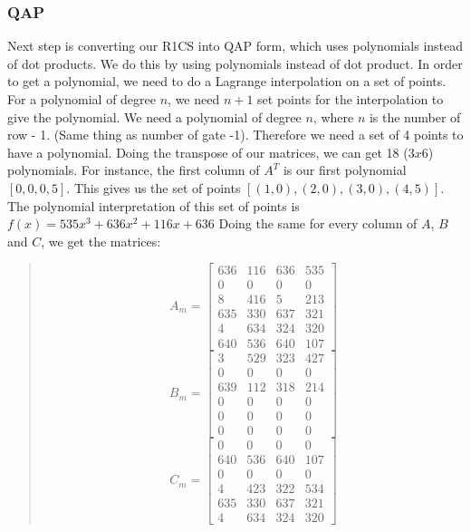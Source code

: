 \subsubsection{QAP}
Next step is converting our R1CS into QAP form, which uses polynomials instead of dot products.
We do this by using polynomials instead of dot product.
In order to get a polynomial, we need to do a Lagrange interpolation on a set of points.
For a polynomial of degree $n$, we need $n+1$ set points for the interpolation to give the polynomial.
We need a polynomial of degree $n$, where $n$ is the number of row - 1. (Same thing as number of gate -1). 
Therefore we need a set of 4 points to have a polynomial.
Doing the transpose of our matrices, we can get 18 ($3x6$) polynomials.
For instance, the first column of $A^T$ is our first polynomial $[0,0,0,5]$.
This gives us the set of points $[(1,0),(2,0),(3,0),(4,5)]$.
The polynomial interpretation of this set of points is $f(x) = 535x^3+636x^2+116x+636$
Doing the same for every column of $A$, $B$ and $C$, we get the matrices:
\begin{quote}
   \[
   A_m =
   \begin{bmatrix}
      636 & 116 & 636 & 535 \\
      0   & 0   & 0   & 0   \\
      8   & 416 & 5   & 213 \\
      635 & 330 & 637 & 321 \\
      4   & 634 & 324 & 320 \\
      640 & 536 & 640 & 107
   \end{bmatrix}
   \]
   \[
   B_m =
   \begin{bmatrix}
      3   & 529 & 323 & 427 \\
      0   & 0   & 0   & 0   \\
      639 & 112 & 318 & 214 \\
      0   & 0   & 0   & 0   \\
      0   & 0   & 0   & 0   \\
      0   & 0   & 0   & 0
   \end{bmatrix}
   \]
   \[
   C_m =
   \begin{bmatrix}
      0   & 0   & 0   & 0   \\
      640 & 536 & 640 & 107 \\
      0   & 0   & 0   & 0   \\
      4   & 423 & 322 & 534 \\
      635 & 330 & 637 & 321 \\
      4   & 634 & 324 & 320
   \end{bmatrix}
   \]
   \end{quote}
   
